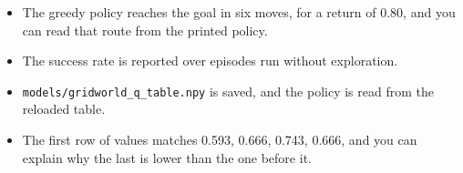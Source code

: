 \begin{labchecklists}
\begin{verification}
\begin{itemize}
  \item The greedy policy reaches the goal in six moves, for a return of $0.80$, and you can read that route from the printed policy.
  \item The success rate is reported over episodes run without exploration.
  \item \texttt{models/gridworld\_q\_table.npy} is saved, and the policy is read from the reloaded table.
  \item The first row of values matches 0.593, 0.666, 0.743, 0.666, and you can explain why the last is lower than the one before it.
\end{itemize}
\end{verification}
\end{labchecklists}
